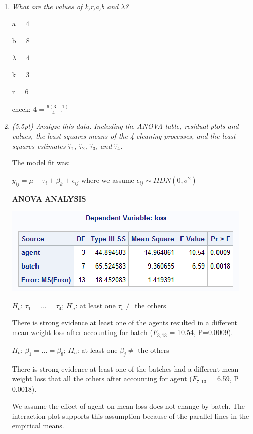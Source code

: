 \documentclass{article}\usepackage[]{graphicx}\usepackage[]{color}
\begin{document}
\begin{enumerate}
\begin{enumerate}
\item %
{\it What are the values of k,r,a,b and $\lambda$?}

a = 4

b = 8

$\lambda$ = 4

k = 3

r = 6

check: $4 = \frac{6(3-1)}{4-1}$

\item %
{\it (5.5pt) Analyze this data. Including the ANOVA table, residual plots and values, the
least squares means of the 4 cleaning processes, and the least squares estimates $\hat{\tau}_{1}$, $\hat{\tau}_{2}$,
$\hat{\tau}_{3}$, and $\hat{\tau}_{4}$.}


The model fit was:

\begin{center}
$y_{ij} = \mu + \tau_{i} + \beta_{k} + \epsilon_{ij}$ where we assume $\epsilon_{ij} \sim IIDN(0,\sigma^{2})$
\end{center}

{\bf ANOVA ANALYSIS}

\includegraphics{prob3anova}

$H_{o}$: $\tau_{1} = ... = \tau_{4}$; $H_{a}$: at least one $\tau_{i} \neq$ the others

There is strong evidence at least one of the agents resulted in a different mean weight loss after accounting for batch ($F_{3,13}$ = 10.54, P=0.0009).

$H_{o}$: $\beta_{1} = ... = \beta_{8}$; $H_{a}$: at least one $\beta_{j} \neq$ the others

There is strong evidence at least one of the batches had a different mean weight loss that all the others after accounting for agent ($F_{7,13}$ = 6.59, P = 0.0018).

We assume the effect of agent on mean loss does not change by batch. The interaction plot supports this assumption because of the parallel lines in the empirical means.


\end{enumerate}
\end{enumerate}
\end{document}
